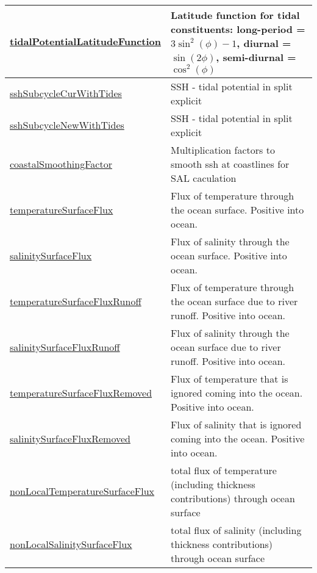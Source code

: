{\begin{center}
\begin{longtable}{| p{2.0in} | p{4.0in} |}
    \hline
    \hyperref[subsec:var_sec_forcing_tidalPotentialLatitudeFunction]{tidalPotentialLatitudeFunction} & Latitude function for tidal constituents: long-period = $3\sin^2(\phi)-1$, diurnal = $\sin(2\phi)$, semi-diurnal = $\cos^2(\phi)$ \\
    \hline
    \hyperref[subsec:var_sec_forcing_sshSubcycleCurWithTides]{sshSubcycleCurWithTides} & SSH - tidal potential in split explicit  \\
    \hline
    \hyperref[subsec:var_sec_forcing_sshSubcycleNewWithTides]{sshSubcycleNewWithTides} & SSH - tidal potential in split explicit  \\
    \hline
    \hyperref[subsec:var_sec_forcing_coastalSmoothingFactor]{coastalSmoothingFactor} & Multiplication factors to smooth ssh at coastlines for SAL caculation \\
    \hline
    \hyperref[subsec:var_sec_forcing_temperatureSurfaceFlux]{temperatureSurfaceFlux} & Flux of temperature through the ocean surface. Positive into ocean. \\
    \hline
    \hyperref[subsec:var_sec_forcing_salinitySurfaceFlux]{salinitySurfaceFlux} & Flux of salinity through the ocean surface. Positive into ocean. \\
    \hline
    \hyperref[subsec:var_sec_forcing_temperatureSurfaceFluxRunoff]{temperatureSurfaceFluxRunoff} & Flux of temperature through the ocean surface due to river runoff. Positive into ocean. \\
    \hline
    \hyperref[subsec:var_sec_forcing_salinitySurfaceFluxRunoff]{salinitySurfaceFluxRunoff} & Flux of salinity through the ocean surface due to river runoff. Positive into ocean. \\
    \hline
    \hyperref[subsec:var_sec_forcing_temperatureSurfaceFluxRemoved]{temperatureSurfaceFluxRemoved} & Flux of temperature that is ignored coming into the ocean. Positive into ocean. \\
    \hline
    \hyperref[subsec:var_sec_forcing_salinitySurfaceFluxRemoved]{salinitySurfaceFluxRemoved} & Flux of salinity that is ignored coming into the ocean. Positive into ocean. \\
    \hline
    \hyperref[subsec:var_sec_forcing_nonLocalTemperatureSurfaceFlux]{nonLocalTemperatureSurfaceFlux} & total flux of temperature (including thickness contributions) through ocean surface \\
    \hline
    \hyperref[subsec:var_sec_forcing_nonLocalSalinitySurfaceFlux]{nonLocalSalinitySurfaceFlux} & total flux of salinity (including thickness contributions) through ocean surface \\

\end{longtable}
\end{center}}
